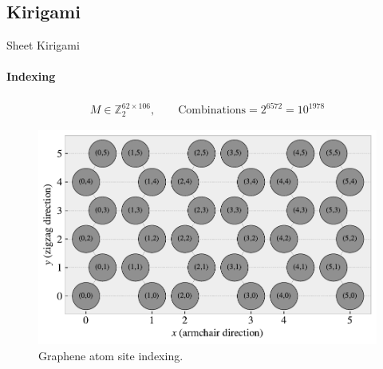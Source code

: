 \documentclass[
	10pt, %
]{beamer}
\renewcommand{\vec}[1]{\mathbf{#1}} %
\begin{document}
%
%
\subsection{Kirigami}

	
%
%
\begin{frame}{Sheet Kirigami}
	\framesubtitle{Indexing}
	\begin{align*}
		M \in \mathbb{Z}_2^{62 \times 106}, \qquad \text{Combinations} = 2^{6572} = 10^{1978}
	\end{align*}
	\begin{figure}[H]
		\centering
		\includegraphics[width=0.7\linewidth]{../thesis/figures/system/atom_indexing.pdf}
		\caption{Graphene atom site indexing.}
	\end{figure}	
\end{frame}
\end{document}
